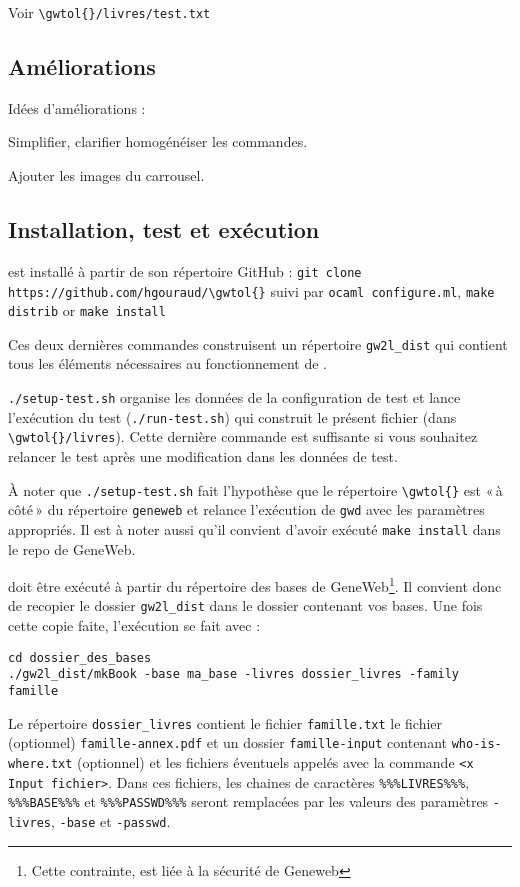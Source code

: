 Voir \verb|\gwtol{}/livres/test.txt|

\subsection{Améliorations}

Idées d'améliorations :
\begin{description}
\item Simplifier, clarifier homogénéiser les commandes.
\item Ajouter les images du carrousel.
\end{description}

\subsection{Installation, test et exécution}

\gwtol{} est installé à partir de son répertoire GitHub :
\verb|git clone https://github.com/hgouraud/\gwtol{}|
suivi par
\verb|ocaml configure.ml|, \verb|make distrib| or \verb|make install|

Ces deux dernières commandes construisent un répertoire \verb|gw2l_dist| qui
contient tous les éléments nécessaires au fonctionnement de \gwtol{}.

\verb|./setup-test.sh| organise les données de la configuration de test et
lance l'exécution du test (\verb|./run-test.sh|) qui construit le présent
fichier (dans \verb|\gwtol{}/livres|). Cette dernière commande est
suffisante si vous souhaitez relancer le test après une modification
dans les données de test.

À noter que \verb|./setup-test.sh| fait l'hypothèse que le répertoire
\verb|\gwtol{}| est «\,à côté\,» du répertoire \verb|geneweb| et relance
l'exécution de \verb|gwd| avec les paramètres appropriés. Il est à noter
aussi qu'il convient d'avoir exécuté \verb|make install| dans le repo de GeneWeb.

\gwtol{} doit être exécuté à partir du répertoire des bases de
GeneWeb\footnote{Cette contrainte, est liée à la sécurité de Geneweb}.
Il convient donc de recopier le dossier \verb|gw2l_dist| dans le
dossier contenant vos bases. Une fois cette copie faite, l'exécution se
fait avec :
\begin{verbatim}
cd dossier_des_bases
./gw2l_dist/mkBook -base ma_base -livres dossier_livres -family famille
\end{verbatim}

Le répertoire \verb|dossier_livres| contient le fichier \verb|famille.txt|
le fichier (optionnel) \verb|famille-annex.pdf| et un dossier
\verb|famille-input| contenant \verb|who-is-where.txt| (optionnel)
et les fichiers éventuels appelés avec la commande \verb|<x Input fichier>|.
Dans ces fichiers, les chaines de caractères \verb|%%%LIVRES%%%|,
\verb|%%%BASE%%%| et \verb|%%%PASSWD%%%| seront remplacées par les valeurs
des paramètres \verb|-livres|, \verb|-base| et \verb|-passwd|.

